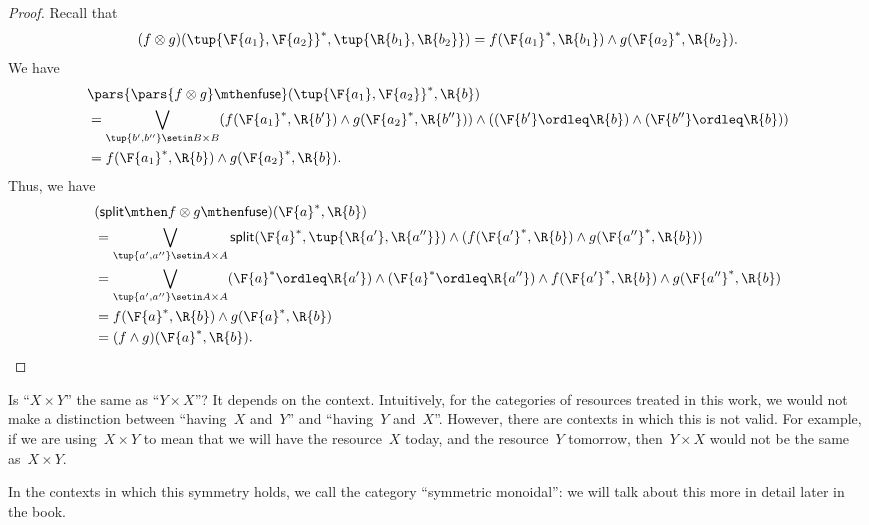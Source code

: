\begin{proof}
    Recall that
    \begin{equation}
        (f\otimes g)(\tup{\F{a_1},\F{a_2}}^*,\tup{\R{b_1},\R{b_2}})
        =f(\F{a_1}^*,\R{b_1})\wedge g(\F{a_2}^*,\R{b_2}).
    \end{equation}
    We have
    \begin{equation}
        \begin{aligned}
             & \pars{\pars{f\otimes g} \mthen \mathsf{fuse}}(\tup{\F{a_1},\F{a_2}}^*,\R{b}) \\
             & =\bigvee_{\tup{b',b''}\setin B\times B}(f(\F{a_1}^*,\R{b'})\wedge g(\F{a_2}^*,\R{b''}))\wedge ((\F{b'}\ordleq \R{b}) \wedge (\F{b''}\ordleq \R{b})) \\
             & =f(\F{a_1}^*,\R{b})\wedge g(\F{a_2}^*,\R{b}).
        \end{aligned}
    \end{equation}
    Thus, we have
    \begin{equation}
        \begin{aligned}
             & (\mathsf{split}\mthen f\otimes g\mthen \mathsf{fuse})(\F{a}^*,\R{b}) \\&=\bigvee_{\tup{a',a''}\setin A\times A} \mathsf{split}(\F{a}^*,\tup{\R{a'},\R{a''}})\wedge (f(\F{a'}^*,\R{b})\wedge g(\F{a''}^*,\R{b}))\\
             & =\bigvee_{\tup{a',a''}\setin A\times A}(\F{a}^*\ordleq \R{a'})\wedge (\F{a}^*\ordleq \R{a''})\wedge f(\F{a'}^*,\R{b})\wedge g(\F{a''}^*,\R{b}) \\
             & =f(\F{a}^*,\R{b})\wedge g(\F{a}^*,\R{b}) \\
             & =(f\wedge g)(\F{a}^*,\R{b}).
        \end{aligned}
    \end{equation}
\end{proof}

Is ``$X \times Y$'' the same as ``$Y \times X$''?
It depends on the context.
Intuitively, for the categories of resources treated in this work, we would not make a distinction between ``having~$X$ and~$Y$'' and ``having~$Y$ and~$X$''.
However, there are contexts in which this is not valid.
For example, if we are using~$X \times Y$ to mean that we will have the resource~$X$ today, and the resource~$Y$ tomorrow, then~$Y \times X$ would not be the same as~$X \times Y$.

In the contexts in which this symmetry holds, we call the category ``symmetric monoidal'': we will talk about this more in detail later in the book.

